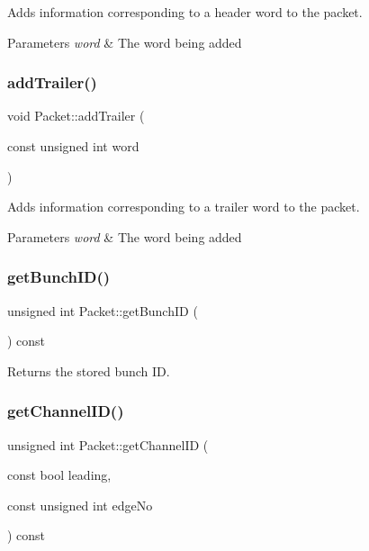 Adds information corresponding to a header word to the packet. 


\begin{DoxyParams}{Parameters}
{\em word} & The word being added \\
\hline
\end{DoxyParams}
\mbox{\label{class_packet_a13eccb2f6b6d527549839579920e5105}} 
\subsubsection{\texorpdfstring{add\+Trailer()}{addTrailer()}}
{\footnotesize\ttfamily void Packet\+::add\+Trailer (\begin{DoxyParamCaption}\item[{const unsigned int}]{word }\end{DoxyParamCaption})}



Adds information corresponding to a trailer word to the packet. 


\begin{DoxyParams}{Parameters}
{\em word} & The word being added \\
\hline
\end{DoxyParams}
\mbox{\label{class_packet_a3965d1b3a0e88e2af7cd1bd5ca97e009}} 
\subsubsection{\texorpdfstring{get\+Bunch\+I\+D()}{getBunchID()}}
{\footnotesize\ttfamily unsigned int Packet\+::get\+Bunch\+ID (\begin{DoxyParamCaption}{ }\end{DoxyParamCaption}) const\hspace{0.3cm}{\ttfamily [inline]}}



Returns the stored bunch ID. 

\mbox{\label{class_packet_a8a767973ff4b30b417716bbb071ccf33}} 
\subsubsection{\texorpdfstring{get\+Channel\+I\+D()}{getChannelID()}}
{\footnotesize\ttfamily unsigned int Packet\+::get\+Channel\+ID (\begin{DoxyParamCaption}\item[{const bool}]{leading,  }\item[{const unsigned int}]{edge\+No }\end{DoxyParamCaption}) const}



